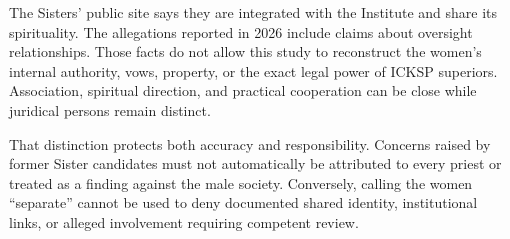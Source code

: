 The Sisters' public site says they are integrated with the Institute and share its spirituality. The allegations reported in 2026 include claims about oversight relationships. Those facts do not allow this study to reconstruct the women's internal authority, vows, property, or the exact legal power of ICKSP superiors. Association, spiritual direction, and practical cooperation can be close while juridical persons remain distinct.

That distinction protects both accuracy and responsibility. Concerns raised by former Sister candidates must not automatically be attributed to every priest or treated as a finding against the male society. Conversely, calling the women ``separate'' cannot be used to deny documented shared identity, institutional links, or alleged involvement requiring competent review.

